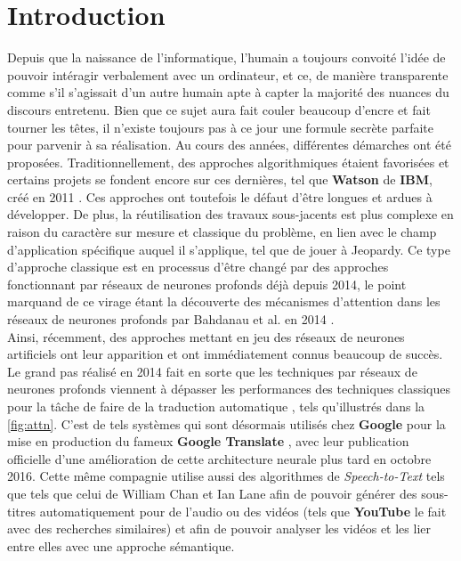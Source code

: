 \section{Introduction}

Depuis que la naissance de l'informatique, l'humain a toujours convoité l'idée de pouvoir intéragir verbalement avec un ordinateur, et ce, de manière transparente comme s'il s'agissait d'un autre humain apte à capter la majorité des nuances du discours entretenu. Bien que ce sujet aura fait couler beaucoup d'encre et fait tourner les têtes, il n'existe toujours pas à ce jour une formule secrète parfaite pour parvenir à sa réalisation. Au cours des années, différentes démarches ont été proposées. Traditionnellement, des approches algorithmiques étaient favorisées et certains projets se fondent encore sur ces dernières, tel que \textbf{Watson} de \textbf{IBM}, créé en 2011 \cite{ibmWatson}. Ces approches ont toutefois le défaut d'être longues et ardues à développer. De plus, la réutilisation des travaux sous-jacents est plus complexe en raison du caractère sur mesure et classique du problème, en lien avec le champ d'application spécifique auquel il s'applique, tel que de jouer à Jeopardy. Ce type d'approche classique est en processus d'être changé par des approches fonctionnant par réseaux de neurones profonds déjà depuis 2014, le point marquand de ce virage étant la découverte des mécanismes d'attention dans les réseaux de neurones profonds par Bahdanau et al. en 2014 \cite{attentionMechanism}.  \\

Ainsi, récemment, des approches mettant en jeu des réseaux de neurones artificiels ont leur apparition et ont immédiatement connus beaucoup de succès. Le grand pas réalisé en 2014 fait en sorte que les techniques par réseaux de neurones profonds viennent à dépasser les performances des techniques classiques pour la tâche de faire de la traduction automatique \cite{attentionMechanism}, tels qu'illustrés dans la  \autoref{fig:attn}. C’est de tels systèmes qui sont désormais utilisés chez \textbf{Google} pour la mise en production du fameux \textbf{Google Translate} \cite{googleTranslate}, avec leur publication officielle d'une amélioration de cette architecture neurale plus tard en octobre 2016. Cette même compagnie utilise aussi des algorithmes de \textit{Speech-to-Text} tels que tels que celui de William Chan et Ian Lane \cite{acousticModeling} afin de pouvoir générer des sous-titres automatiquement pour de l'audio ou des vidéos (tels que \textbf{YouTube} le fait avec des recherches similaires) et afin de pouvoir analyser les vidéos et les lier entre elles avec une approche sémantique.

